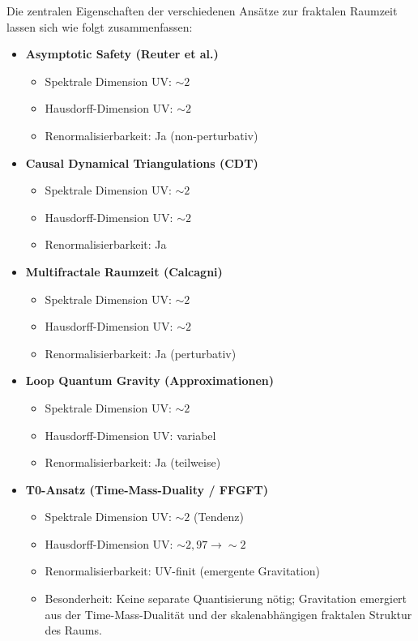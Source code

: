 	Die zentralen Eigenschaften der verschiedenen Ansätze zur fraktalen Raumzeit lassen sich wie folgt zusammenfassen:
	
	\begin{itemize}
		\item \textbf{Asymptotic Safety (Reuter et al.)}
		\begin{itemize}
			\item Spektrale Dimension UV: $\sim 2$
			\item Hausdorff-Dimension UV: $\sim 2$
			\item Renormalisierbarkeit: Ja (non-perturbativ)
		\end{itemize}
		
		\item \textbf{Causal Dynamical Triangulations (CDT)}
		\begin{itemize}
			\item Spektrale Dimension UV: $\sim 2$
			\item Hausdorff-Dimension UV: $\sim 2$
			\item Renormalisierbarkeit: Ja
		\end{itemize}
		
		\item \textbf{Multifractale Raumzeit (Calcagni)}
		\begin{itemize}
			\item Spektrale Dimension UV: $\sim 2$
			\item Hausdorff-Dimension UV: $\sim 2$
			\item Renormalisierbarkeit: Ja (perturbativ)
		\end{itemize}
		
		\item \textbf{Loop Quantum Gravity (Approximationen)}
		\begin{itemize}
			\item Spektrale Dimension UV: $\sim 2$
			\item Hausdorff-Dimension UV: variabel
			\item Renormalisierbarkeit: Ja (teilweise)
		\end{itemize}
		
		\item \textbf{T0-Ansatz (Time-Mass-Duality / FFGFT)}
		\begin{itemize}
			\item Spektrale Dimension UV: $\sim 2$ (Tendenz)
			\item Hausdorff-Dimension UV: $\sim 2{,}97 \rightarrow \sim 2$
			\item Renormalisierbarkeit: UV-finit (emergente Gravitation)
			\item Besonderheit: Keine separate Quantisierung nötig; Gravitation emergiert aus der Time-Mass-Dualität und der skalenabhängigen fraktalen Struktur des Raums.
		\end{itemize}
	\end{itemize}
	
